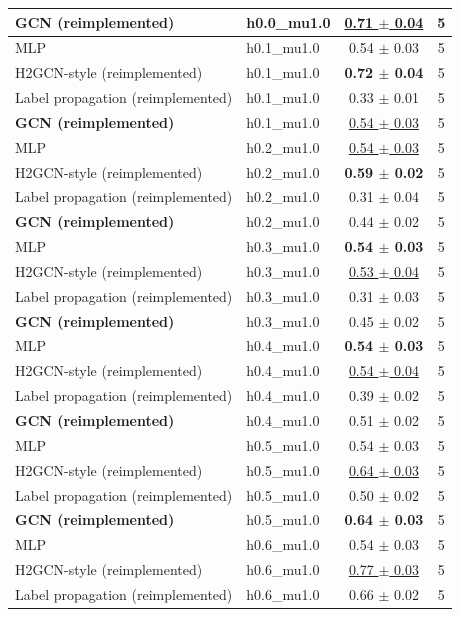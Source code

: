 \begin{tabular}{llcc}
\textbf{GCN (reimplemented)} & h0.0\_mu1.0 & \underline{0.71 $\pm$ 0.04} & 5 \\
\midrule
MLP & h0.1\_mu1.0 & 0.54 $\pm$ 0.03 & 5 \\
H2GCN-style (reimplemented) & h0.1\_mu1.0 & \textbf{0.72 $\pm$ 0.04} & 5 \\
Label propagation (reimplemented) & h0.1\_mu1.0 & 0.33 $\pm$ 0.01 & 5 \\
\textbf{GCN (reimplemented)} & h0.1\_mu1.0 & \underline{0.54 $\pm$ 0.03} & 5 \\
\midrule
MLP & h0.2\_mu1.0 & \underline{0.54 $\pm$ 0.03} & 5 \\
H2GCN-style (reimplemented) & h0.2\_mu1.0 & \textbf{0.59 $\pm$ 0.02} & 5 \\
Label propagation (reimplemented) & h0.2\_mu1.0 & 0.31 $\pm$ 0.04 & 5 \\
\textbf{GCN (reimplemented)} & h0.2\_mu1.0 & 0.44 $\pm$ 0.02 & 5 \\
\midrule
MLP & h0.3\_mu1.0 & \textbf{0.54 $\pm$ 0.03} & 5 \\
H2GCN-style (reimplemented) & h0.3\_mu1.0 & \underline{0.53 $\pm$ 0.04} & 5 \\
Label propagation (reimplemented) & h0.3\_mu1.0 & 0.31 $\pm$ 0.03 & 5 \\
\textbf{GCN (reimplemented)} & h0.3\_mu1.0 & 0.45 $\pm$ 0.02 & 5 \\
\midrule
MLP & h0.4\_mu1.0 & \textbf{0.54 $\pm$ 0.03} & 5 \\
H2GCN-style (reimplemented) & h0.4\_mu1.0 & \underline{0.54 $\pm$ 0.04} & 5 \\
Label propagation (reimplemented) & h0.4\_mu1.0 & 0.39 $\pm$ 0.02 & 5 \\
\textbf{GCN (reimplemented)} & h0.4\_mu1.0 & 0.51 $\pm$ 0.02 & 5 \\
\midrule
MLP & h0.5\_mu1.0 & 0.54 $\pm$ 0.03 & 5 \\
H2GCN-style (reimplemented) & h0.5\_mu1.0 & \underline{0.64 $\pm$ 0.03} & 5 \\
Label propagation (reimplemented) & h0.5\_mu1.0 & 0.50 $\pm$ 0.02 & 5 \\
\textbf{GCN (reimplemented)} & h0.5\_mu1.0 & \textbf{0.64 $\pm$ 0.03} & 5 \\
\midrule
MLP & h0.6\_mu1.0 & 0.54 $\pm$ 0.03 & 5 \\
H2GCN-style (reimplemented) & h0.6\_mu1.0 & \underline{0.77 $\pm$ 0.03} & 5 \\
Label propagation (reimplemented) & h0.6\_mu1.0 & 0.66 $\pm$ 0.02 & 5 \\

\end{tabular}
